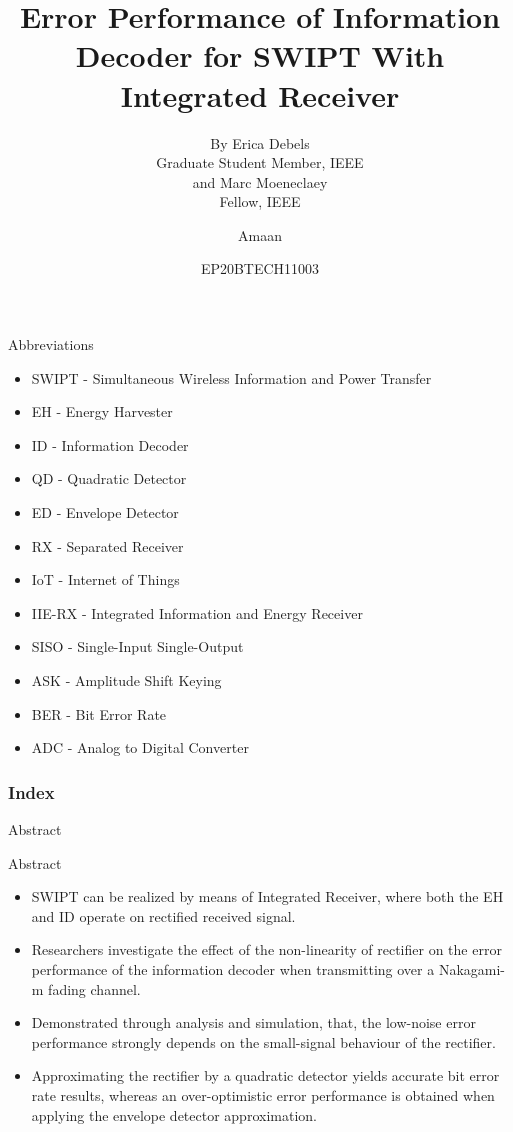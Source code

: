 \documentclass{beamer}
\title{Error Performance of Information Decoder for SWIPT With Integrated Receiver
}
\subtitle{By Erica Debels\\ Graduate Student Member, IEEE\\ and Marc Moeneclaey\\ Fellow, IEEE
}
\author{Amaan}
\date{EP20BTECH11003}
\institute{Indian Institute of Technology Hyderabad}
\begin{document}
\begin{frame}
    \titlepage
\end{frame}
\begin{frame}{Abbreviations}
    \begin{itemize}
        \item SWIPT - Simultaneous Wireless Information and Power Transfer
        \item EH - Energy Harvester
        \item ID - Information Decoder
        \item QD - Quadratic Detector
        \item ED - Envelope Detector
        \item RX - Separated Receiver
        \item IoT - Internet of Things
        \item IIE-RX - Integrated Information and Energy Receiver 
        \item SISO - Single-Input Single-Output
        \item ASK - Amplitude Shift Keying
        \item BER - Bit Error Rate 
        \item ADC - Analog to Digital Converter
    \end{itemize}
\end{frame}
\begin{frame}
\frametitle{Index}
\tableofcontents
\end{frame}
    \begin{section}{Abstract}
\begin{frame}{Abstract}
    \begin{itemize}
        \item SWIPT can be realized by means of Integrated Receiver, where both the EH and ID operate on rectified received signal.
        \item Researchers investigate the effect of the non-linearity of rectifier on the error performance of the information decoder when transmitting over a Nakagami-m fading channel.
        \item Demonstrated through analysis and simulation, that, the low-noise error performance strongly depends on the small-signal behaviour of the rectifier.
        \item  Approximating the rectifier by a quadratic detector yields accurate bit error rate results, whereas an over-optimistic error performance is obtained when applying the envelope detector approximation.
    \end{itemize}
\end{frame}
\end{section}
\end{document}
